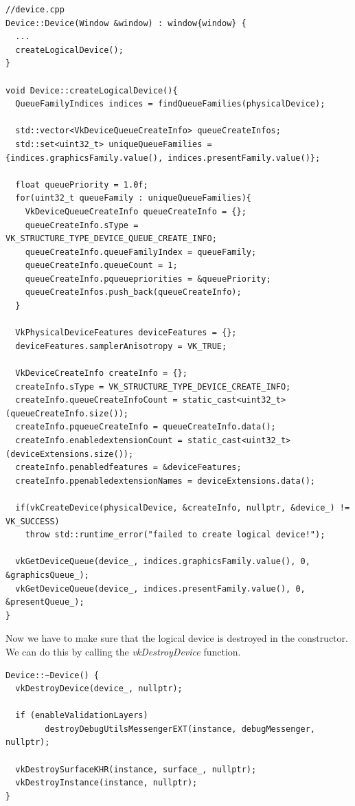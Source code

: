 \documentclass[12pt]{report} \usepackage{preamble}
\begin{document}
\begin{lstlisting}[Language=C++]
//device.cpp
Device::Device(Window &window) : window{window} {
  ...
  createLogicalDevice();
}

void Device::createLogicalDevice(){
  QueueFamilyIndices indices = findQueueFamilies(physicalDevice);

  std::vector<VkDeviceQueueCreateInfo> queueCreateInfos;
  std::set<uint32_t> uniqueQueueFamilies = {indices.graphicsFamily.value(), indices.presentFamily.value()};

  float queuePriority = 1.0f;
  for(uint32_t queueFamily : uniqueQueueFamilies){
    VkDeviceQueueCreateInfo queueCreateInfo = {};
    queueCreateInfo.sType = VK_STRUCTURE_TYPE_DEVICE_QUEUE_CREATE_INFO;
    queueCreateInfo.queueFamilyIndex = queueFamily;
    queueCreateInfo.queueCount = 1;
    queueCreateInfo.pqueuepriorities = &queuePriority;
    queueCreateInfos.push_back(queueCreateInfo);
  }

  VkPhysicalDeviceFeatures deviceFeatures = {};
  deviceFeatures.samplerAnisotropy = VK_TRUE;

  VkDeviceCreateInfo createInfo = {};
  createInfo.sType = VK_STRUCTURE_TYPE_DEVICE_CREATE_INFO;
  createInfo.queueCreateInfoCount = static_cast<uint32_t>(queueCreateInfo.size());
  createInfo.pqueueCreateInfo = queueCreateInfo.data();
  createInfo.enabledextensionCount = static_cast<uint32_t>(deviceExtensions.size());
  createInfo.penabledfeatures = &deviceFeatures;
  createInfo.ppenabledextensionNames = deviceExtensions.data();

  if(vkCreateDevice(physicalDevice, &createInfo, nullptr, &device_) != VK_SUCCESS)
    throw std::runtime_error("failed to create logical device!");

  vkGetDeviceQueue(device_, indices.graphicsFamily.value(), 0, &graphicsQueue_);
  vkGetDeviceQueue(device_, indices.presentFamily.value(), 0, &presentQueue_);
}
\end{lstlisting}

Now we have to make sure that the logical device is destroyed in the constructor.
We can do this by calling the \textit{vkDestroyDevice} function.

\begin{lstlisting}[Language=C++]
Device::~Device() {
  vkDestroyDevice(device_, nullptr);

  if (enableValidationLayers)
		destroyDebugUtilsMessengerEXT(instance, debugMessenger, nullptr);

  vkDestroySurfaceKHR(instance, surface_, nullptr);
  vkDestroyInstance(instance, nullptr);
}
\end{lstlisting}
\end{document}

